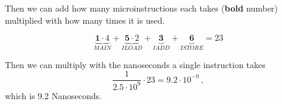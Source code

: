 Then we can add how many microinstructions each takes (\textbf{bold} number) multiplied with how many times it is used.

\begin{equation}
    \underbrace{\mathbf 1 \cdot 4}_{MAIN} + \underbrace{\mathbf 5 \cdot 2}_{ILOAD} + \underbrace{\mathbf 3}_{IADD} + \underbrace{\mathbf 6}_{ISTORE} = 23
\end{equation}

Then we can multiply with the nanoseconds a single instruction takes
\begin{equation}
    \frac 1 {2.5 \cdot 10^9} \cdot 23 = 9.2 \cdot 10^{-9}\,,
\end{equation}
which is 9.2 Nanoseconds.

